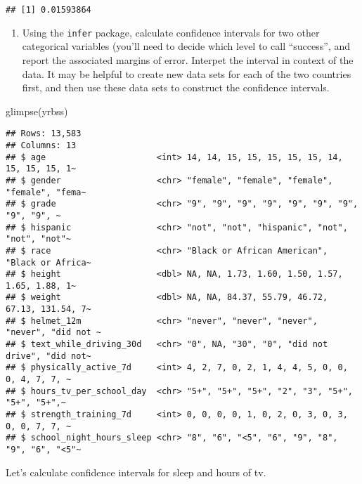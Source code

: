 \documentclass[
]{article}
\newenvironment{Shaded}{\begin{snugshade}}{\end{snugshade}}
\newcommand{\CommentTok}[1]{\textcolor[rgb]{0.56,0.35,0.01}{\textit{#1}}}
\newcommand{\FunctionTok}[1]{\textcolor[rgb]{0.00,0.00,0.00}{#1}}
\newcommand{\NormalTok}[1]{#1}
\newcommand{\SpecialCharTok}[1]{\textcolor[rgb]{0.00,0.00,0.00}{#1}}
\providecommand{\tightlist}{%
  \setlength{\itemsep}{0pt}\setlength{\parskip}{0pt}}
\begin{document}
\begin{verbatim}
## [1] 0.01593864
\end{verbatim}

\begin{enumerate}
\def\labelenumi{\arabic{enumi}.}
\setcounter{enumi}{3}
\tightlist
\item
  Using the \texttt{infer} package, calculate confidence intervals for
  two other categorical variables (you'll need to decide which level to
  call ``success'', and report the associated margins of error. Interpet
  the interval in context of the data. It may be helpful to create new
  data sets for each of the two countries first, and then use these data
  sets to construct the confidence intervals.
\end{enumerate}

\begin{Shaded}
\begin{Highlighting}[]
\FunctionTok{glimpse}\NormalTok{(yrbss)}
\end{Highlighting}
\end{Shaded}

\begin{verbatim}
## Rows: 13,583
## Columns: 13
## $ age                      <int> 14, 14, 15, 15, 15, 15, 15, 14, 15, 15, 15, 1~
## $ gender                   <chr> "female", "female", "female", "female", "fema~
## $ grade                    <chr> "9", "9", "9", "9", "9", "9", "9", "9", "9", ~
## $ hispanic                 <chr> "not", "not", "hispanic", "not", "not", "not"~
## $ race                     <chr> "Black or African American", "Black or Africa~
## $ height                   <dbl> NA, NA, 1.73, 1.60, 1.50, 1.57, 1.65, 1.88, 1~
## $ weight                   <dbl> NA, NA, 84.37, 55.79, 46.72, 67.13, 131.54, 7~
## $ helmet_12m               <chr> "never", "never", "never", "never", "did not ~
## $ text_while_driving_30d   <chr> "0", NA, "30", "0", "did not drive", "did not~
## $ physically_active_7d     <int> 4, 2, 7, 0, 2, 1, 4, 4, 5, 0, 0, 0, 4, 7, 7, ~
## $ hours_tv_per_school_day  <chr> "5+", "5+", "5+", "2", "3", "5+", "5+", "5+",~
## $ strength_training_7d     <int> 0, 0, 0, 0, 1, 0, 2, 0, 3, 0, 3, 0, 0, 7, 7, ~
## $ school_night_hours_sleep <chr> "8", "6", "<5", "6", "9", "8", "9", "6", "<5"~
\end{verbatim}

Let's calculate confidence intervals for sleep and hours of tv.

\begin{Shaded}
\end{Shaded}
\end{document}
